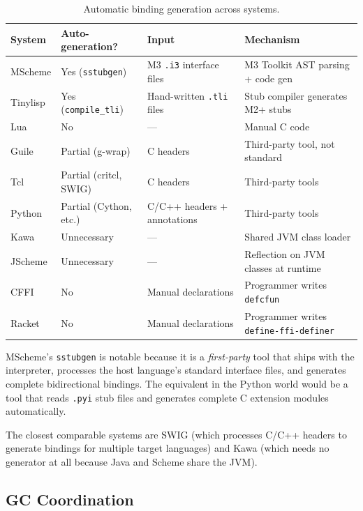\documentclass[11pt]{article}
\begin{document}
\begin{table}[ht]
\centering
\small
\begin{tabular}{@{}llll@{}}
\toprule
System   & Auto-generation? & Input & Mechanism \\
\midrule
MScheme  & Yes (\texttt{sstubgen})       & M3 \texttt{.i3} interface files    & M3 Toolkit AST parsing + code gen \\
Tinylisp & Yes (\texttt{compile\_tli})   & Hand-written \texttt{.tli} files   & Stub compiler generates M2+ stubs \\
Lua      & No                     & ---                           & Manual C code \\
Guile    & Partial (g-wrap)       & C headers                   & Third-party tool, not standard \\
Tcl      & Partial (critcl, SWIG) & C headers                   & Third-party tools \\
Python   & Partial (Cython, etc.) & C/C++ headers + annotations & Third-party tools \\
Kawa     & Unnecessary            & ---                           & Shared JVM class loader \\
JScheme  & Unnecessary            & ---                           & Reflection on JVM classes at runtime \\
CFFI     & No                     & Manual declarations         & Programmer writes \texttt{defcfun} \\
Racket   & No                     & Manual declarations         & Programmer writes \texttt{define-ffi-definer} \\
\bottomrule
\end{tabular}
\caption{Automatic binding generation across systems.}
\label{tab:auto-binding}
\end{table}

MScheme's \texttt{sstubgen} is notable because it is a
\emph{first-party} tool that ships with the interpreter, processes the
host language's standard interface files, and generates complete
bidirectional bindings.  The equivalent in the Python world would be a
tool that reads \texttt{.pyi} stub files and generates complete C
extension modules automatically.

The closest comparable systems are SWIG (which processes C/C++ headers
to generate bindings for multiple target languages) and Kawa (which
needs no generator at all because Java and Scheme share the JVM).


\subsection{GC Coordination}
\label{sec:gc-coordination}
\end{document}

